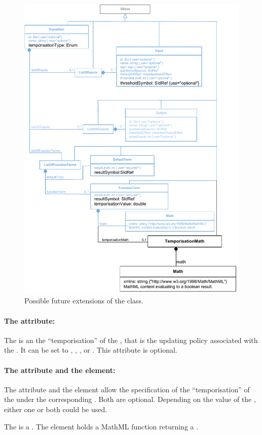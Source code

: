 \begin{figure}[hb]
  \includegraphics{figs/qual-transition-future-uml.pdf}
  \caption{Possible future extensions of the \Transition class.}
  \label{qual_future_directions}
\end{figure}

\paragraph{The  attribute:} %
The  is an  the ``temporisation'' of the , that is the updating policy associated with the . It can be set to , , ,  or .
This attribute is optional. 



\paragraph{The  attribute and the  element:}
The attribute  and the element  allow the specification of the ``temporisation'' of the  under the corresponding . Both are optional. Depending on the value of the , either one or both could be used.

The  is a . The element  holds a MathML function returning a . 

